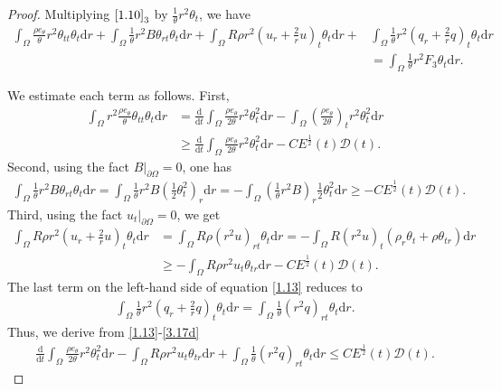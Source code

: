 \documentclass[11pt,reqno]{amsart}
\numberwithin{equation}{section}
\newcommand{\dif}{\mathrm{d}}
\begin{document}
\begin{proof}
 Multiplying $\eqref{1.10}_3$ by $\frac{1}{\theta} r^2 \theta_t$, we have
 \begin{align}
 \int_{\Omega} \frac{\rho e_\theta}{\theta} r^2 \theta_{tt}\theta_t \dif r+ \int_{\Omega} \frac{1}{\theta} r^2  B \theta_{rt} \theta_t \dif r +\int_{\Omega}  R \rho r^2(u_r+\frac{2}{r}u)_t  \theta_t \dif r
 +&\int_{\Omega} \frac{1}{\theta} r^2 (q_r+\frac{2}{r} q)_t \theta_t \dif r  \nonumber\\
 &=\int_{\Omega} \frac{1}{\theta} r^2 F_3  \theta_t \dif r . \label{1.13}
 \end{align}

  We estimate each term as follows.
First,
\begin{align}
\int_{\Omega} r^2 \frac{\rho e_\theta}{\theta} \theta_{tt} \theta_t \dif r& =\frac{\dif}{\dif t} \int_{\Omega} \frac{\rho e_\theta}{2\theta} r^2 \theta_t^2 \dif r -\int_{\Omega} \left( \frac{\rho e_\theta}{2\theta}\right)_t r^2 \theta_t^2 \dif r \nonumber\\
&\ge \frac{\dif}{\dif t} \int_{\Omega} \frac{\rho e_\theta}{2 \theta} r^2 \theta_t^2 \dif r- CE^\frac{1}{2}(t) \mathcal D(t). \label{3.17a}
\end{align}
Second, using the fact $B|_{\partial \Omega}=0$, one has
\begin{align}
\int_{\Omega} \frac{1}{\theta} r^2 B \theta_{rt} \theta_t \dif r = \int_{\Omega} \frac{1}{\theta} r^2 B \left(\frac{1}{2} \theta_t^2\right)_r \dif r
=-\int_{\Omega} \left(\frac{1}{\theta} r^2 B\right)_r \frac{1}{2}\theta_t^2 \dif r \ge -CE^\frac{1}{2}(t) \mathcal D(t). \label{3.17b}
\end{align}
 Third, using the fact $u_t|_{\partial \Omega}=0$, we get
 \begin{align}
 \int_{\Omega} R \rho r^2 (u_r+\frac{2}{r}u)_t \theta_t \dif r&=\int_{\Omega} R \rho (r^2 u)_{rt} \theta_t \dif r=-\int_{\Omega} R(r^2 u)_t  (\rho_r \theta_t+\rho \theta_{tr})\dif r \nonumber\\
& \ge -\int_{\Omega} R \rho r^2 u_t \theta_{tr} \dif r- CE^\frac{1}{2}(t) \mathcal D(t).
\label{3.17c}
 \end{align}
 The last term on the left-hand side of equation \eqref{1.13} reduces to
 \begin{align}
 \int_{\Omega} \frac{1}{\theta} r^2 \left( q_r+\frac{2}{r} q\right)_t \theta_t \dif r =\int_{\Omega} \frac{1}{\theta} (r^2 q)_{rt} \theta_t \dif r. \label{3.17d}
 \end{align}
 Thus, we derive from \eqref{1.13}-\eqref{3.17d}
 \begin{align}\label{1.14}
 \frac{\dif}{\dif t} \int_{\Omega} \frac{\rho e_\theta}{2\theta} r^2 \theta_t^2 \dif r -\int_{\Omega} R \rho r^2 u_t \theta_{tr} \dif r+\int_{\Omega} \frac{1}{\theta} (r^2 q)_{rt} \theta_t \dif r \le CE^\frac{1}{2}(t) \mathcal D(t).
 \end{align}


\end{proof}
\end{document}

